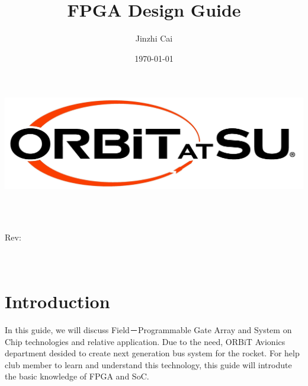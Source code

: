\documentclass[12pt,article]{memoir}
\title{FPGA Design Guide}
\author{Jinzhi Cai}
\date{\today}
\makeatletter
\newcommand\@itemcode{}
\newcommand\@revnumber{}
\makeatother
\begin{document}

\makeatletter
	\includegraphics[width=\textwidth]{../logo.jpg}\\[4ex]
	\begin{center}
	{\fontsize{50}{60}\selectfont \bfseries  \@title }\\[2ex] 
	{\LARGE  \@itemcode}\\
	\end{center}
	\begin{flushright}
	\vspace*{\fill}
	{\LARGE Rev: \@revnumber}\\[2ex]
	{\large \@author}\\[2ex]
	{\large \@date}\\[20ex]
	\end{flushright}
\makeatother
\thispagestyle{empty}
\newpage

\tableofcontents*
\thispagestyle{fancy}
\newpage


\chapter{Introduction}
In this guide, we will discuss Field－Programmable Gate Array and System on Chip technologies and relative application. Due to the need, ORBiT Avionics department desided to create next generation bus system for the rocket. For help club member to learn and understand this technology, this guide will introdute the basic knowledge of FPGA and SoC.
\end{document}
